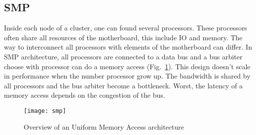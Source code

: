 \subsection{SMP}
Inside each node of a cluster, one can found several processors.
%
These processors often share all resources of the motherboard, this include IO and memory.
%
The way to interconnect all processors with elements of the motherboard can differ.
%
In SMP architecture, all processors are connected to a data bus and a bus arbiter choose with processor can do a memory access (Fig.~\ref{fig:smp}).
%
This design doesn't scale in performance when the number processor grow up.
%
The bandwidth is shared by all processors and the bus arbiter become a bottleneck.
%
Worst, the latency of a memory access depends on the congestion of the bus.

\begin{figure}[!ht]
        \centering
        \texttt{[image: smp]}
        \caption{Overview of an Uniform Memory Access architecture}
        \label{fig:smp}
\end{figure}
